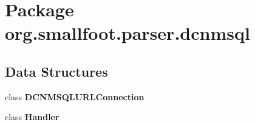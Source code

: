 \section{Package org.\+smallfoot.\+parser.\+dcnmsql}
\label{namespaceorg_1_1smallfoot_1_1parser_1_1dcnmsql}
\subsection*{Data Structures}
\begin{DoxyCompactItemize}
\item 
class {\bf D\+C\+N\+M\+S\+Q\+L\+U\+R\+L\+Connection}
\item 
class {\bf Handler}
\end{DoxyCompactItemize}
